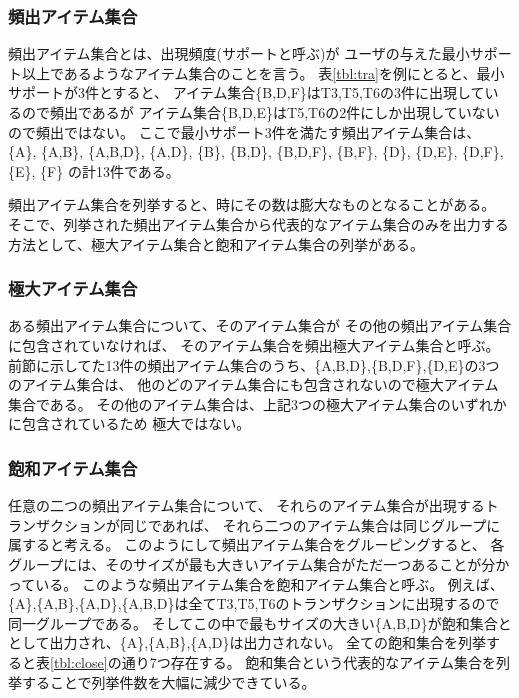 \subsubsection{頻出アイテム集合}
頻出アイテム集合とは、出現頻度(サポートと呼ぶ)が
ユーザの与えた最小サポート以上であるようなアイテム集合のことを言う。
表\ref{tbl:tra}を例にとると、最小サポートが3件とすると、
アイテム集合\{B,D,F\}はT3,T5,T6の3件に出現しているので頻出であるが
アイテム集合\{B,D,E\}はT5,T6の2件にしか出現していないので頻出ではない。
ここで最小サポート3件を満たす頻出アイテム集合は、
\{A\},
\{A,B\},
\{A,B,D\},
\{A,D\},
\{B\},
\{B,D\},
\{B,D,F\},
\{B,F\},
\{D\},
\{D,E\},
\{D,F\},
\{E\},
\{F\}
の計13件である。

頻出アイテム集合を列挙すると、時にその数は膨大なものとなることがある。
そこで、列挙された頻出アイテム集合から代表的なアイテム集合のみを出力する
方法として、極大アイテム集合と飽和アイテム集合の列挙がある。

\subsubsection{極大アイテム集合}
ある頻出アイテム集合について、そのアイテム集合が
その他の頻出アイテム集合に包含されていなければ、
そのアイテム集合を頻出極大アイテム集合と呼ぶ。
前節に示してた13件の頻出アイテム集合のうち、\{A,B,D\},\{B,D,F\},\{D,E\}の3つのアイテム集合は、
他のどのアイテム集合にも包含されないので極大アイテム集合である。
その他のアイテム集合は、上記3つの極大アイテム集合のいずれかに包含されているため
極大ではない。

\subsubsection{飽和アイテム集合}
任意の二つの頻出アイテム集合について、
それらのアイテム集合が出現するトランザクションが同じであれば、
それら二つのアイテム集合は同じグループに属すると考える。
このようにして頻出アイテム集合をグルーピングすると、
各グループには、そのサイズが最も大きいアイテム集合がただ一つあることが分かっている。
このような頻出アイテム集合を飽和アイテム集合と呼ぶ。
例えば、\{A\},\{A,B\},\{A,D\},\{A,B,D\}は全てT3,T5,T6のトランザクションに出現するので同一グループである。
そしてこの中で最もサイズの大きい\{A,B,D\}が飽和集合ととして出力され、\{A\},\{A,B\},\{A,D\}は出力されない。
全ての飽和集合を列挙すると表\ref{tbl:close}の通り7つ存在する。
飽和集合という代表的なアイテム集合を列挙することで列挙件数を大幅に減少できている。


